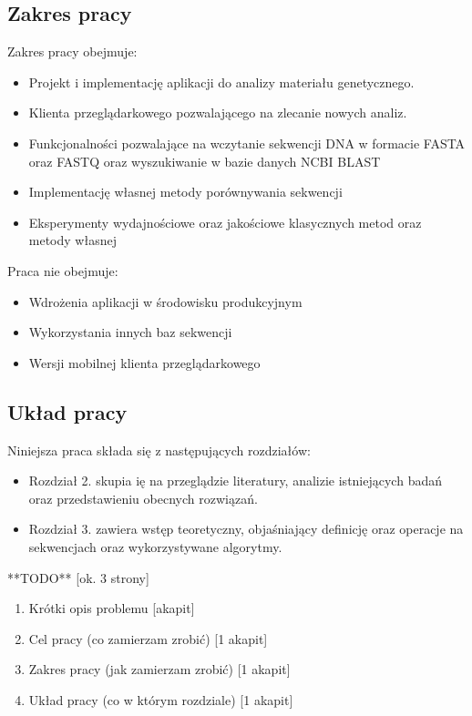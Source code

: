 \subsection {
    Zakres pracy
}

Zakres pracy obejmuje:
\begin{itemize}
    \item Projekt i implementację aplikacji do analizy materiału genetycznego.
    \item Klienta przeglądarkowego pozwalającego na zlecanie nowych analiz.
    \item {
        Funkcjonalności pozwalające na wczytanie sekwencji DNA w formacie FASTA oraz FASTQ
        oraz wyszukiwanie w bazie danych NCBI BLAST
    }
    \item Implementację własnej metody porównywania sekwencji 
    \item Eksperymenty wydajnościowe oraz jakościowe klasycznych metod oraz metody własnej
\end{itemize}

Praca nie obejmuje:
\begin{itemize}
    \item Wdrożenia aplikacji w środowisku produkcyjnym
    \item Wykorzystania innych baz sekwencji
    \item Wersji mobilnej klienta przeglądarkowego
\end{itemize}

\subsection {
    Układ pracy
}

Niniejsza praca składa się z następujących rozdziałów:

\begin{itemize}
    \item {
        Rozdział 2. skupia ię na przeglądzie literatury, analizie istniejących
        badań oraz przedstawieniu obecnych rozwiązań.
    }
    \item {
        Rozdział 3. zawiera wstęp teoretyczny, objaśniający definicję oraz 
        operacje na sekwencjach oraz wykorzystywane algorytmy.
    }
\end{itemize}















**TODO** [ok. 3 strony]

\begin{enumerate}
    \item Krótki opis problemu [akapit]
    \item Cel pracy (co zamierzam zrobić) [1 akapit]
    \item Zakres pracy (jak zamierzam zrobić) [1 akapit]
    \item Układ pracy (co w którym rozdziale) [1 akapit]
\end{enumerate}



